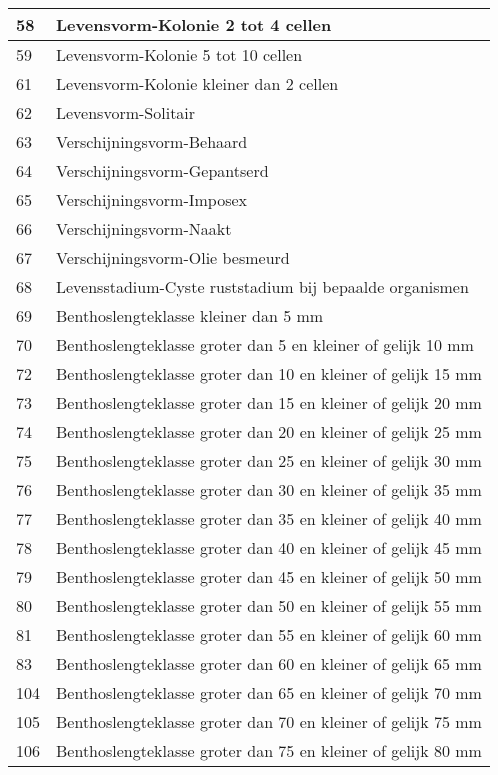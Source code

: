 \documentclass[
]{book}
\begin{document}
\begin{table}
\begin{tabular}[t]{l|l}
\hline
58 & Levensvorm-Kolonie 2 tot 4 cellen\\
\hline
59 & Levensvorm-Kolonie 5 tot 10 cellen\\
\hline
61 & Levensvorm-Kolonie kleiner dan 2 cellen\\
\hline
62 & Levensvorm-Solitair\\
\hline
63 & Verschijningsvorm-Behaard\\
\hline
64 & Verschijningsvorm-Gepantserd\\
\hline
65 & Verschijningsvorm-Imposex\\
\hline
66 & Verschijningsvorm-Naakt\\
\hline
67 & Verschijningsvorm-Olie besmeurd\\
\hline
68 & Levensstadium-Cyste ruststadium bij bepaalde organismen\\
\hline
69 & Benthoslengteklasse kleiner dan 5 mm\\
\hline
70 & Benthoslengteklasse groter dan 5 en kleiner of gelijk 10 mm\\
\hline
72 & Benthoslengteklasse groter dan 10 en kleiner of gelijk 15 mm\\
\hline
73 & Benthoslengteklasse groter dan 15 en kleiner of gelijk 20 mm\\
\hline
74 & Benthoslengteklasse groter dan 20 en kleiner of gelijk 25 mm\\
\hline
75 & Benthoslengteklasse groter dan 25 en kleiner of gelijk 30 mm\\
\hline
76 & Benthoslengteklasse groter dan 30 en kleiner of gelijk 35 mm\\
\hline
77 & Benthoslengteklasse groter dan 35 en kleiner of gelijk 40 mm\\
\hline
78 & Benthoslengteklasse groter dan 40 en kleiner of gelijk 45 mm\\
\hline
79 & Benthoslengteklasse groter dan 45 en kleiner of gelijk 50 mm\\
\hline
80 & Benthoslengteklasse groter dan 50 en kleiner of gelijk 55 mm\\
\hline
81 & Benthoslengteklasse groter dan 55 en kleiner of gelijk 60 mm\\
\hline
83 & Benthoslengteklasse groter dan 60 en kleiner of gelijk 65 mm\\
\hline
104 & Benthoslengteklasse groter dan 65 en kleiner of gelijk 70 mm\\
\hline
105 & Benthoslengteklasse groter dan 70 en kleiner of gelijk 75 mm\\
\hline
106 & Benthoslengteklasse groter dan 75 en kleiner of gelijk 80 mm\\

\end{tabular}
\end{table}
\end{document}
